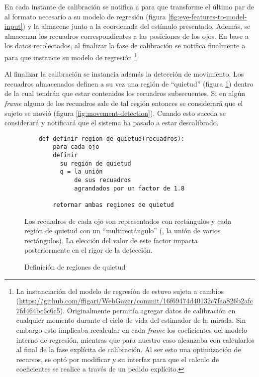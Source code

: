   En cada instante de calibración se notifica a \webgazer para que transforme
  el último par de \features al formato necesario a su modelo de regresión
  (figura \ref{fig:eye-features-to-model-input}) y la almacene junto a la
  coordenada del estímulo presentado.
  Además, se almacenan los recuadros correspondientes a las posiciones de los
  ojos.
  En base a los datos recolectados, al finalizar la fase de calibración se
  notifica finalmente a \webgazer para que instancie su modelo de regresión
  \footnote{
    La instanciación del modelo de regresión de \webgazer estuvo sujeta a
    cambios
    (\url{https://github.com/ffigari/WebGazer/commit/16f69474d40132c7faa826b2afc7fd464bc6c6c5}).
    Originalmente \webgazer permitía agregar datos de calibración en cualquier
    momento durante el ciclo de vida del estimador de la mirada.
    Sin embargo esto implicaba recalcular en cada \textit{frame} los
    coeficientes del modelo interno de regresión, mientras que para nuestro
    caso alcanzaba con calcularlos al final de la fase explícita de
    calibración.
    Al ser esto una optimización de recursos, se optó por modificar \webgazer y
    su interfaz para que el calculo de coeficientes se realice a través de un
    pedido explícito.
  }

  Al finalizar la calibración se instancia además la detección de movimiento.
  Los recuadros almacenados definen a su vez una región de ``quietud'' (figura
  \ref{fig:features-to-stillness-region}) dentro de la cual tendrán que estar
  contenidos los recuadros subsecuentes.
  Si en algún \textit{frame} alguno de los recuadros sale de tal región
  entonces se considerará que el sujeto se movió (figura
  \ref{fig:movement-detection}).
  Cuando esto suceda se considerará y notificará que el sistema ha pasado a 
  estar descalibrado.

  \begin{figure}
    \begin{verbatim}
    def definir-region-de-quietud(recuadros):
        para cada ojo
        definir
          su región de quietud
          q = la unión
              de sus recuadros
              agrandados por un factor de 1.8

        retornar ambas regiones de quietud\end{verbatim}
    Los recuadros de cada ojo son representados con rectángulos y cada
    región de quietud con un ``multirectángulo'' (\ie, la unión de varios
    rectángulos).
    La elección del valor de este factor impacta posteriormente en el rigor de
    la detección.
    \caption{Definición de regiones de quietud}
    \label{fig:features-to-stillness-region}
  \end{figure}

